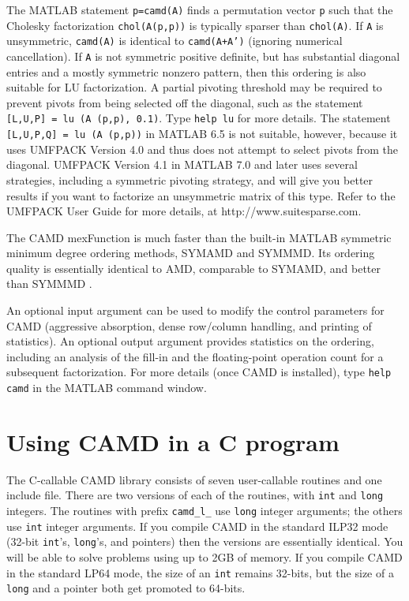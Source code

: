\documentclass[11pt]{article}
\begin{document}
The MATLAB statement {\tt p=camd(A)} finds a permutation vector {\tt p} such
that the Cholesky factorization {\tt chol(A(p,p))} is typically sparser than
{\tt chol(A)}.
If {\tt A} is unsymmetric, {\tt camd(A)} is identical to {\tt camd(A+A')}
(ignoring numerical cancellation).
If {\tt A} is not symmetric positive definite,
but has substantial diagonal entries and a mostly symmetric nonzero pattern,
then this ordering is also suitable for LU factorization.  A partial pivoting
threshold may be required to prevent pivots from being selected off the
diagonal, such as the statement {\tt [L,U,P] = lu (A (p,p), 0.1)}.
Type {\tt help lu} for more details.
The statement {\tt [L,U,P,Q] = lu (A (p,p))} in MATLAB 6.5 is
not suitable, however, because it uses UMFPACK Version 4.0 and thus
does not attempt to select pivots from the diagonal.
UMFPACK Version 4.1 in MATLAB 7.0 and later
uses several strategies, including a symmetric pivoting strategy, and
will give you better results if you want to factorize an unsymmetric matrix
of this type.  Refer to the UMFPACK User Guide for more details, at
http://www.suitesparse.com.

The CAMD mexFunction is much faster than the built-in MATLAB symmetric minimum
degree ordering methods, SYMAMD and SYMMMD.  Its ordering quality is
essentially identical to AMD, comparable to SYMAMD, and better than SYMMMD
\cite{DavisGilbertLarimoreNg04}.

An optional input argument can be used to modify the control parameters for
CAMD (aggressive absorption, dense row/column handling, and printing of
statistics).  An optional output
argument provides statistics on the ordering, including an analysis of the
fill-in and the floating-point operation count for a subsequent factorization.
For more details (once CAMD is installed),
type {\tt help camd} in the MATLAB command window.

\section{Using CAMD in a C program}
\label{Cversion}

The C-callable CAMD library consists of seven user-callable routines and one
include file.  There are two versions of each of the routines, with
{\tt int} and {\tt long} integers.
The routines with prefix
{\tt camd\_l\_} use {\tt long} integer arguments; the others use
{\tt int} integer arguments.  If you compile CAMD in the standard
ILP32 mode (32-bit {\tt int}'s, {\tt long}'s, and pointers) then the versions
are essentially identical.  You will be able to solve problems using up to 2GB
of memory.  If you compile CAMD in the standard LP64 mode, the size of an
{\tt int} remains 32-bits, but the size of a {\tt long} and a pointer both get
promoted to 64-bits.
\end{document}
